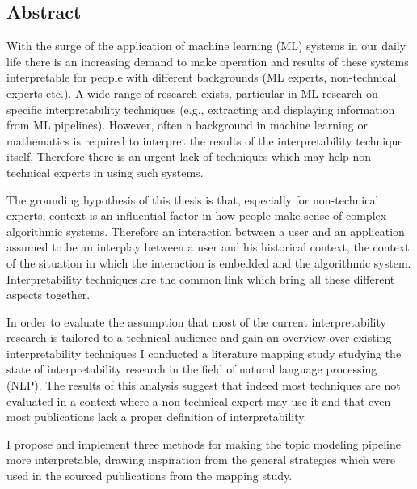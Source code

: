 %
\pagestyle{empty}

\subsection*{Abstract}

With the surge of the application of machine learning (ML) systems in our daily life there is an increasing demand to make operation and results of these systems interpretable for people with different backgrounds (ML experts, non-technical experts etc.). A wide range of research exists, particular in ML research on specific interpretability techniques (e.g., extracting and displaying information from ML pipelines). However, often a background in machine learning or mathematics is required to interpret the results of the interpretability technique itself. Therefore there is an urgent lack of techniques which may help non-technical experts in using such systems.

The grounding hypothesis of this thesis is that, especially for non-technical experts, context is an influential factor in how people make sense of complex algorithmic systems. Therefore an interaction between a user and an application assumed to be an interplay between a user and his historical context, the context of the situation in which the interaction is embedded and the algorithmic system. Interpretability techniques are the common link which bring all these different aspects together.

In order to evaluate the assumption that most of the current interpretability research is tailored to a technical audience and gain an overview over existing interpretability techniques I conducted a literature mapping study studying the state of interpretability research in the field of natural language processing (NLP). The results of this analysis suggest that indeed most techniques are not evaluated in a context where a non-technical expert may use it and that even most publications lack a proper definition of interpretability.

I propose and implement three methods for making the topic modeling pipeline more interpretable, drawing inspiration from the general strategies which were used in the sourced publications from the mapping study.

